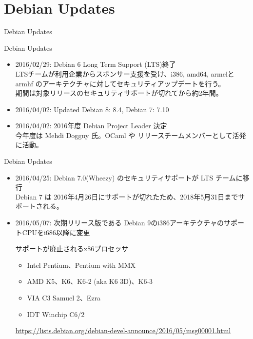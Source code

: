 \section{Debian Updates}
\begin{frame}\begin{center}\Huge{Debian Updates}\end{center}\end{frame}

\begin{frame}{Debian Updates}%

\begin{itemize}[<+->]
\item 2016/02/29: Debian 6 Long Term Support (LTS)終了\\
   \pause \small{LTSチームが利用企業からスポンサー支援を受け、i386, amd64, armelとarmhf
   のアーキテクチャに対してセキュリティアップデートを行う。\\
   期間は対象リリースのセキュリティサポートが切れてから約2年間。}
   \pause
\item 2016/04/02: Updated Debian 8: 8.4, Debian 7: 7.10
\item 2016/04/02: 2016年度 Debian Project Leader 決定\\
		今年度は Mehdi Dogguy 氏。OCaml や リリースチームメンバーとして活発に活動。
\end{itemize}

\end{frame}

\begin{frame}{Debian Updates}%

\begin{itemize}[<+->]
\item 2016/04/25: Debian 7.0(Wheezy) のセキュリティサポートが LTS チームに移行 \\
   \pause \small{Debian 7 は 2016年4月26日にサポートが切れたため、2018年5月31日までサポートされる。}

\item 2016/05/07: 次期リリース版である Debian 9のi386アーキテクチャのサポートCPUをi686以降に変更 

サポートが廃止されるx86プロセッサ
\begin{itemize}
\item Intel Pentium、Pentium with MMX
\item AMD K5、K6、K6-2 (aka K6 3D)、K6-3
\item VIA C3 Samuel 2、Ezra
\item IDT Winchip C6/2
\end{itemize}
{\tiny \url{https://lists.debian.org/debian-devel-announce/2016/05/msg00001.html}} 

\end{itemize}
\end{frame}

